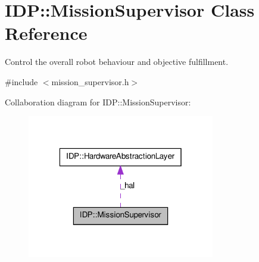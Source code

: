 \hypertarget{classIDP_1_1MissionSupervisor}{
\section{IDP::MissionSupervisor Class Reference}
\label{classIDP_1_1MissionSupervisor}
}


Control the overall robot behaviour and objective fulfillment.  




{\ttfamily \#include $<$mission\_\-supervisor.h$>$}



Collaboration diagram for IDP::MissionSupervisor:\nopagebreak
\begin{figure}[H]
\begin{center}
\leavevmode
\includegraphics[width=232pt]{classIDP_1_1MissionSupervisor__coll__graph}
\end{center}
\end{figure}
